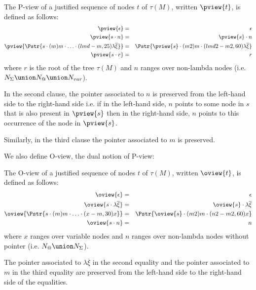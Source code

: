 \begin{dfn}
The P-view of a justified sequence of nodes $t$ of $\tau(M)$, written $\pview{t}$, is defined as follows:
\begin{eqnarray*}
 \pview{\epsilon} &=&  \epsilon \\
 \pview{s \cdot n }  &=&  \pview{s} \cdot n \\
 \pview{\Pstr{ s \cdot (m){m} \cdot \ldots \cdot (lmd-m,25){\lambda \overline{\xi}}}} &=&
        \Pstr{ \pview{s} \cdot (m2){m} \cdot (lmd2-m2,60){\lambda \overline{\xi}} } \\
 \pview{s \cdot r }  &=&  r
\end{eqnarray*}
where $r$ is the root of the tree $\tau(M)$ and $n$ ranges over
non-lambda nodes (i.e. $N_\Sigma \union N_@ \union N_{var}$).

In the second clause, the pointer associated to $n$ is preserved
from the left-hand side to the right-hand side i.e. if in the
left-hand side, $n$ points to some node in $s$ that is also present
in $\pview{s}$ then in the right-hand side, $n$ points to this
occurrence of the node in $\pview{s}$.

Similarly, in the third clause the pointer associated to $m$ is preserved.
\end{dfn}

We also define O-view, the dual notion of P-view:
\begin{dfn}
The O-view of a justified sequence of nodes $t$ of $\tau(M)$, written $\oview{t}$, is defined as follows:
\begin{eqnarray*}
 \oview{\epsilon} &=&  \epsilon \\
 \oview{s \cdot \lambda \overline{\xi} }  &=&  \oview{s} \cdot \lambda \overline{\xi} \\
 \oview{\Pstr{s \cdot (m){m} \cdot \ldots \cdot (x-m,30){x}}} &=&
    \Pstr{ \oview{s} \cdot (m2){m} \cdot (n2-m2,60){x} } \\
 \oview{s \cdot n }  &=&  n
\end{eqnarray*}
where $x$ ranges over variable nodes and  $n$ ranges over non-lambda
nodes without pointer (i.e. $N_@ \union N_\Sigma$).

The pointer associated to $\lambda \overline{\xi}$ in the second
equality and the pointer associated to $m$ in the third equality are
preserved from the left-hand side to the right-hand side of the
equalities.
\end{dfn}

